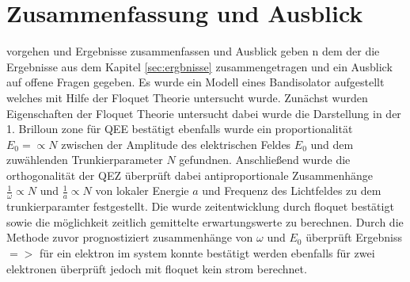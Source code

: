 \chapter{Zusammenfassung und Ausblick}
\label{sec:zusamm}
vorgehen und Ergebnisse zusammenfassen und Ausblick geben
n dem der
die Ergebnisse aus dem Kapitel \ref{sec:ergbnisse}
zusammengetragen und ein Ausblick auf offene Fragen
gegeben.
Es wurde ein Modell eines Bandisolator aufgestellt welches
mit Hilfe der Floquet Theorie untersucht wurde.
Zunächst wurden Eigenschaften der Floquet Theorie untersucht
dabei wurde die Darstellung in der 1. Brilloun zone für
QEE bestätigt ebenfalls
wurde ein proportionalität  $E_0=\propto N$  zwischen
der Amplitude des elektrischen Feldes $E_0$
und dem zuwählenden Trunkierparameter $N$ gefundnen.
Anschließend wurde die orthogonalität der QEZ überprüft dabei
antiproportionale Zusammenhänge
$\frac{1}{\omega}\propto N$ und  $\frac{1}{a}\propto N$ von
lokaler Energie $a$ und Frequenz des Lichtfeldes
 zu dem trunkierparamter
 festgestellt.
Die wurde zeitentwicklung durch floquet bestätigt
sowie die möglichkeit zeitlich gemittelte erwartungswerte
 zu berechnen. Durch die
 Methode zuvor prognostiziert zusammenhänge von
 $\omega$ und $E_0$ überprüft
 Ergebniss $=>$ für ein elektron im system
 konnte bestätigt werden
ebenfalls für zwei elektronen überprüft jedoch
mit floquet kein strom berechnet.
